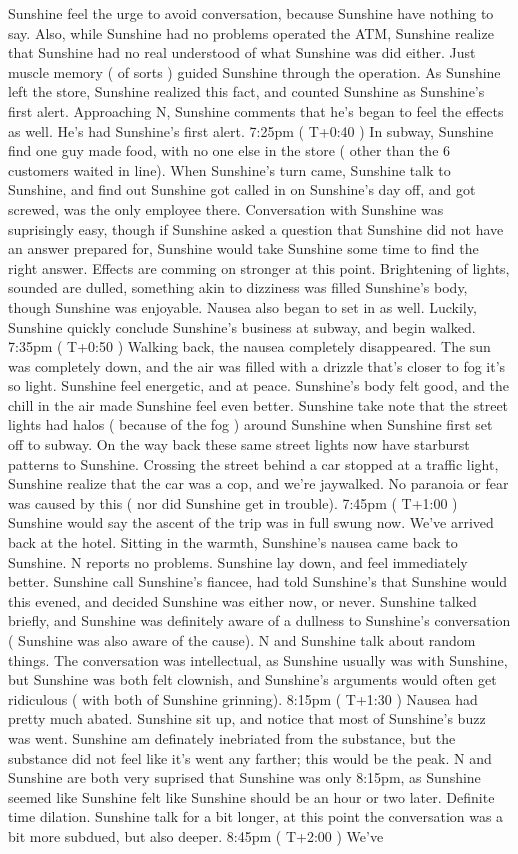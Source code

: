 \documentclass[12pt]{book}
\begin{document}
Sunshine feel the urge to avoid conversation, because Sunshine have nothing to say. Also, while Sunshine had no problems operated the ATM, Sunshine realize that Sunshine had no real understood of what Sunshine was did either. Just muscle memory ( of sorts ) guided Sunshine through the operation. As Sunshine left the store, Sunshine realized this fact, and counted Sunshine as Sunshine's first alert. Approaching N, Sunshine comments that he's began to feel the effects as well. He's had Sunshine's first alert. 7:25pm ( T+0:40 ) In subway, Sunshine find one guy made food, with no one else in the store ( other than the 6 customers waited in line). When Sunshine's turn came, Sunshine talk to Sunshine, and find out Sunshine got called in on Sunshine's day off, and got screwed, was the only employee there. Conversation with Sunshine was suprisingly easy, though if Sunshine asked a question that Sunshine did not have an answer prepared for, Sunshine would take Sunshine some time to find the right answer. Effects are comming on stronger at this point. Brightening of lights, sounded are dulled, something akin to dizziness was filled Sunshine's body, though Sunshine was enjoyable. Nausea also began to set in as well. Luckily, Sunshine quickly conclude Sunshine's business at subway, and begin walked. 7:35pm ( T+0:50 ) Walking back, the nausea completely disappeared. The sun was completely down, and the air was filled with a drizzle that's closer to fog it's so light. Sunshine feel energetic, and at peace. Sunshine's body felt good, and the chill in the air made Sunshine feel even better. Sunshine take note that the street lights had halos ( because of the fog ) around Sunshine when Sunshine first set off to subway. On the way back these same street lights now have starburst patterns to Sunshine. Crossing the street behind a car stopped at a traffic light, Sunshine realize that the car was a cop, and we're jaywalked. No paranoia or fear was caused by this ( nor did Sunshine get in trouble). 7:45pm ( T+1:00 ) Sunshine would say the ascent of the trip was in full swung now. We've arrived back at the hotel. Sitting in the warmth, Sunshine's nausea came back to Sunshine. N reports no problems. Sunshine lay down, and feel immediately better. Sunshine call Sunshine's fiancee, had told Sunshine's that Sunshine would this evened, and decided Sunshine was either now, or never. Sunshine talked briefly, and Sunshine was definitely aware of a dullness to Sunshine's conversation ( Sunshine was also aware of the cause). N and Sunshine talk about random things. The conversation was intellectual, as Sunshine usually was with Sunshine, but Sunshine was both felt clownish, and Sunshine's arguments would often get ridiculous ( with both of Sunshine grinning). 8:15pm ( T+1:30 ) Nausea had pretty much abated. Sunshine sit up, and notice that most of Sunshine's buzz was went. Sunshine am definately inebriated from the substance, but the substance did not feel like it's went any farther; this would be the peak. N and Sunshine are both very suprised that Sunshine was only 8:15pm, as Sunshine seemed like Sunshine felt like Sunshine should be an hour or two later. Definite time dilation. Sunshine talk for a bit longer, at this point the conversation was a bit more subdued, but also deeper. 8:45pm ( T+2:00 ) We've 
\end{document}
